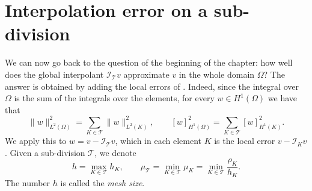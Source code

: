 \section{Interpolation error on a sub-division}
\label{sec:FEM interpolation error subdivision}

We can now go back to the question of the beginning of the chapter: how well does the global interpolant $\mathcal I_{\mathcal T} v$ approximate $v$ in the whole domain $\Omega$?
The answer is obtained by adding the local errors of .
Indeed, since the integral over $\Omega$ is the sum of the integrals over the elements, for every $w \in H^1(\Omega)$ we have that
\begin{equation}
    \label{eq:FEM localisation}
    \| w \|_{L^2(\Omega)}^2 = \sum_{K \in \mathcal T} \| w \|_{L^2(K)}^2,
    \qquad
    [ w ]_{H^1(\Omega)}^2 = \sum_{K \in \mathcal T} [ w ]_{H^1(K)}^2 .
\end{equation}
We apply this to $w = v - \mathcal I_{\mathcal T} v$, which in each element $K$ is the local error $v - \mathcal I_K v$.
Given a sub-division $\mathcal T$, we denote
\begin{equation*}
    h = \max_{K \in \mathcal T} h_K,
    \qquad
    \mu_{\mathcal T} = \min_{K \in \mathcal T} \mu_K = \min_{K \in \mathcal T} \frac{\rho_K}{h_K}.
\end{equation*}
The number $h$ is called the \emph{mesh size}.


